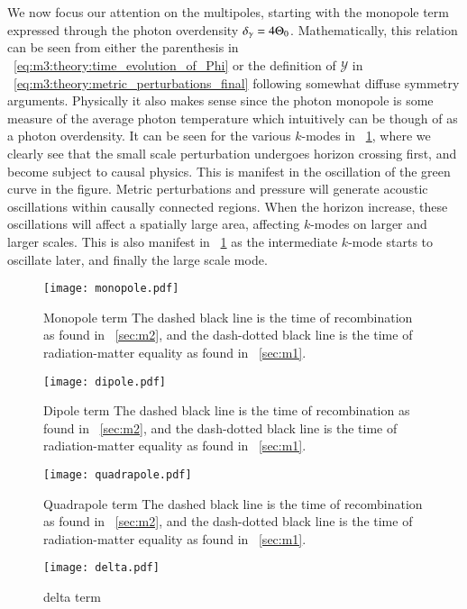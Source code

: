     We now focus our attention on the multipoles, starting with the monopole term expressed through the photon overdensity $\delta_\gamma = 4\Theta_0$. Mathematically, this relation can be seen  from either the parenthesis in ~\cref{eq:m3:theory:time_evolution_of_Phi} or the definition of $\mathcal{Y}$ in ~\cref{eq:m3:theory:metric_perturbations_final} following somewhat diffuse symmetry arguments. Physically it also makes sense since the photon monopole is some measure of the average photon temperature which intuitively can be though of as a photon overdensity. It can be seen for the various $k$-modes in ~\cref{fig:m3:monopole}, where we clearly see that the small scale perturbation undergoes horizon crossing first, and become subject to causal physics. This is manifest in the oscillation of the green curve in the figure. Metric perturbations and pressure will generate acoustic oscillations within causally connected regions. When the horizon increase, these oscillations will affect a spatially large area, affecting $k$-modes on larger and larger scales. This is also manifest in ~\cref{fig:m3:monopole} as the intermediate $k$-mode starts to oscillate later, and finally the large scale mode. 
    \begin{figure}
        \texttt{[image: monopole.pdf]}
        \caption{Monopole term The dashed black line is the time of recombination as found in ~\cref{sec:m2}, and the dash-dotted black line is the time of radiation-matter equality as found in ~\cref{sec:m1}.}
        \label{fig:m3:monopole}
    \end{figure}

    \begin{figure}
        \texttt{[image: dipole.pdf]}
        \caption{Dipole term The dashed black line is the time of recombination as found in ~\cref{sec:m2}, and the dash-dotted black line is the time of radiation-matter equality as found in ~\cref{sec:m1}.}
        \label{fig:m3:dipole}
    \end{figure}

    \begin{figure}
        \texttt{[image: quadrapole.pdf]}
        \caption{Quadrapole term The dashed black line is the time of recombination as found in ~\cref{sec:m2}, and the dash-dotted black line is the time of radiation-matter equality as found in ~\cref{sec:m1}.}
        \label{fig:m3:quadrapole}
    \end{figure}

    \begin{figure}
        \texttt{[image: delta.pdf]}
        \caption{delta term}
        \label{fig:m3:delta}
    \end{figure}

